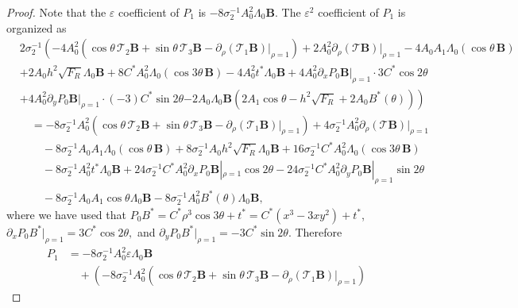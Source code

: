 \documentclass[12pt,reqno]{amsart}
\numberwithin{equation}{section}
\theoremstyle{definition}
\theoremstyle{remark}
\begin{document}
\begin{proof}
Note that the $\varepsilon$ coefficient of $P_1$ is $ -8\sigma_2^{-1}A_0^2 \Lambda_0  \textbf{B} $. The $\varepsilon^2$ coefficient of $P_1$   is organized  as
\begin{align*}
&2\sigma_2^{-1}\left( -4A_0^2\left (\cos\theta\,\mathcal{T}_2  \textbf{B}+
\sin\theta\,\mathcal{T}_3  \textbf{B}-\partial_\rho(\mathcal{T}_1  \textbf{B})|_{\rho=1}\right )
+2A_0^2\partial_\rho(\mathcal{T}  \textbf{B})|_{\rho=1}
-4A_0A_1\Lambda_0( \cos\theta\, \textbf{B})\right . \\
&
  +2A_0h^2\sqrt{F_R}\Lambda_0  \textbf{B}
+8C^*A_0^2\Lambda_0( \cos3\theta\,  \textbf{B})-4A_0^2t^*\Lambda_0  \textbf{B}+4A_0^2\partial_xP_0  \textbf{B}|_{\rho=1}
\cdot 3C^*\cos2\theta\\
& 
+4A_0^2\partial_yP_0  \textbf{B}|_{\rho=1}
\cdot(-3)C^*\sin2\theta  \left .-2A_0\Lambda_0  \textbf{B}\left (2A_1\cos\theta-h^2\sqrt{F_R}+2A_0B^*(\theta)\right )\right)\\
&\quad=  -8\sigma_2^{-1}A_0^2\left (\cos\theta\,\mathcal{T}_2  \textbf{B}+
\sin\theta\,\mathcal{T}_3  \textbf{B}-\partial_\rho(\mathcal{T}_1  \textbf{B})|_{\rho=1}\right )
+4\sigma_2^{-1}A_0^2\partial_\rho(\mathcal{T}  \textbf{B})|_{\rho=1}
 \\
&\qquad -8\sigma_2^{-1}A_0A_1\Lambda_0( \cos\theta\, \textbf{B})+8\sigma_2^{-1}A_0h^2\sqrt{F_R}\Lambda_0  \textbf{B}
+16\sigma_2^{-1}C^*A_0^2\Lambda_0( \cos3\theta\, \textbf{B}) \\
&\qquad -8\sigma_2^{-1}A_0^2t^*\Lambda_0  \textbf{B}+24\sigma_2^{-1}C^*A_0^2\partial_xP_0  \textbf{B}|_{\rho=1}\cos2\theta
-24\sigma_2^{-1}C^*A_0^2\partial_yP_0  \textbf{B}|_{\rho=1}\sin2\theta \\
&\qquad  -8\sigma_2^{-1}A_0A_1\cos\theta\Lambda_0  \textbf{B}-8\sigma_2^{-1}A_0^2B^*(\theta)\Lambda_0  \textbf{B},
\end{align*}
where we have used that $ P_0B^*=C^*\rho^3\cos3\theta+t^*=C^*(x^3-3xy^2)+t^* $, $ \partial_xP_0B^*\big|_{\rho=1}=3C^*\cos2\theta,  $ and $ \partial_yP_0B^*\big|_{\rho=1}=-3C^* \sin2\theta. $ Therefore
\begin{align*}
P_1&=-8\sigma_2^{-1}A_0^2 \varepsilon\Lambda_0  \textbf{B} \\
&\quad + \left( -8\sigma_2^{-1}A_0^2\left (\cos\theta\,\mathcal{T}_2  \textbf{B}+
\sin\theta\,\mathcal{T}_3  \textbf{B}-\partial_\rho(\mathcal{T}_1  \textbf{B})|_{\rho=1}\right )

\end{align*}
\end{proof}
\end{document}
